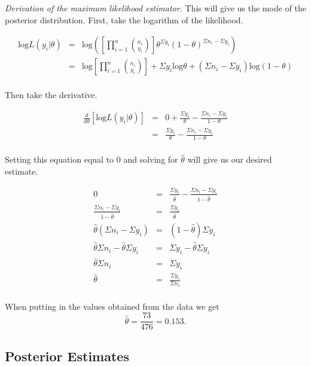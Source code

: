 \documentclass[12pt]{article}
\begin{document}
\noindent \textit{Derivation of the maximum likelihood estimator.}  This will give us the mode of the posterior distribution.  First, take the logarithm of the likelihood.

\begin{eqnarray*}
\mathrm{log}L(y_i|\theta)&=& \mathrm{log}\left(\left[\prod_{i=1}^n{n_i \choose y_i}\right]\theta^{\Sigma y_i}(1-\theta)^{\Sigma n_i-\Sigma y_i}\right) \\
&=& \mathrm{log}\left[\prod_{i=1}^n{n_i \choose y_i}\right]+\Sigma y_i\mathrm{log}\theta+(\Sigma n_i-\Sigma y_i)\mathrm{log}(1-\theta) \\
\end{eqnarray*}

\noindent Then take the derivative.  

\begin{eqnarray*}
\frac{d}{d\theta}\left[\mathrm{log}L(y_i|\theta)\right] &=& 0 + \frac{\Sigma y_i}{\theta} - \frac{\Sigma n_i-\Sigma y_i}{1-\theta} \\
&=& \frac{\Sigma y_i}{\theta} - \frac{\Sigma n_i-\Sigma y_i}{1-\theta} \\
\end{eqnarray*}

\noindent Setting this equation equal to 0 and solving for $\hat{\theta}$ will give us our desired estimate.

\begin{eqnarray*}
0 &=& \frac{\Sigma y_i}{\hat{\theta}} - \frac{\Sigma n_i-\Sigma y_i}{1-\hat{\theta}}\\
\frac{\Sigma n_i-\Sigma y_i}{1-\hat{\theta}} &=& \frac{\Sigma y_i}{\hat{\theta}} \\
\hat{\theta}(\Sigma n_i-\Sigma y_i) &=& (1-\hat{\theta})\Sigma y_i \\
\hat{\theta}\Sigma n_i - \hat{\theta}\Sigma y_i &=& \Sigma y_i -\hat{\theta}\Sigma y_i \\
\hat{\theta}\Sigma n_i &=& \Sigma y_i \\
\hat{\theta} &=& \frac{\Sigma y_i}{\Sigma n_i} \\
\end{eqnarray*}

\noindent When putting in the values obtained from the data we get
\[\hat{\theta}=\frac{73}{476}=0.153.\]



\subsection{Posterior Estimates}
\end{document}
